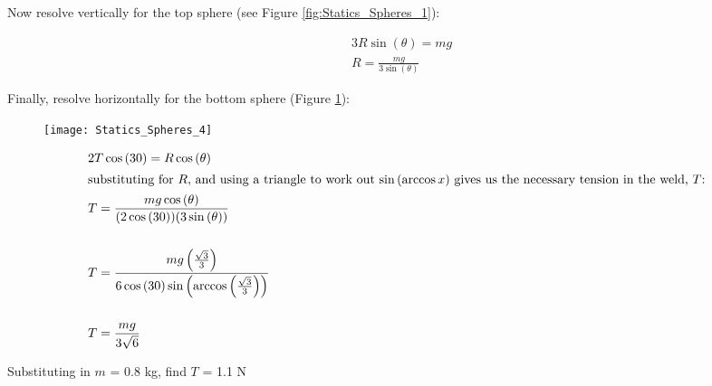 \begin{problem}
{Now resolve vertically for the top sphere (see Figure \ref{fig:Statics_Spheres_1}):

\begin{align*} &3R\sin{(\theta)} = mg \\
&R = \frac{mg}{3\sin{(\theta)}} \end{align*}

Finally, resolve horizontally for the bottom sphere (Figure \ref{fig:Statics_Spheres_4}):

\begin{figure}[h]
	\centering
	\texttt{[image: Statics\_Spheres\_4]}
	\caption{}	
	\label{fig:Statics_Spheres_4}
\end{figure}

\begin{align*} &2T\cos{(30)} = R\cos{(\theta)} \\
\intertext{substituting for $R$, and using a triangle to work out $\sin{(\arccos{x})}$ gives us the necessary tension in the weld, $T$:} &T = \frac{mg\cos{(\theta)}}{(2\cos{(30)})(3\sin{(\theta)})} \\
\\ &T = \frac{mg\left(\frac{\sqrt{3}}{3}\right)}{6\cos{(30)}\sin{\left(\arccos{\left(\frac{\sqrt{3}}{3}\right)}\right)}} \\
\\ &T = \frac{mg}{3\sqrt{6}}\end{align*}

Substituting in $m$ = 0.8 kg, find $T$ = 1.1 N
}
\end{problem}